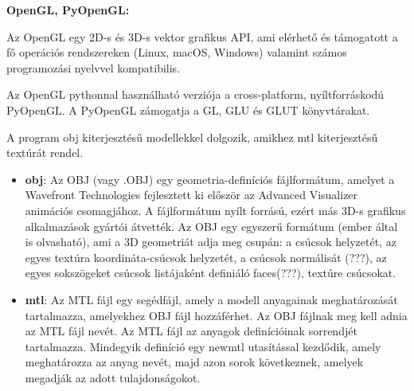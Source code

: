 



{\bf OpenGL, PyOpenGL:}

Az OpenGL egy 2D-s és 3D-s vektor grafikus  API, ami elérhető és támogatott a fő operációs rendszereken (Linux, macOS, Windows) valamint számos programozási nyelvvel kompatibilis.

Az OpenGL pythonnal használható verziója a cross-platform, nyíltforráskodú PyOpenGL. A PyOpenGL zámogatja a GL, GLU és GLUT könyvtárakat.

A program obj kiterjesztésű modellekkel dolgozik, amikhez mtl kiterjesztésű textúrát rendel. 
\begin{itemize}
\item {\bf obj}: Az OBJ (vagy .OBJ) egy geometria-definíciós fájlformátum, amelyet a Wavefront Technologies fejlesztett ki először az Advanced Visualizer animációs csomagjához. A fájlformátum nyílt forrású, ezért más 3D-s grafikus alkalmazások gyártói átvették.
Az OBJ egy egyszerű formátum (ember által is olvasható), ami a 3D geometriát adja meg csupán: a csúcsok helyzetét, az egyes textúra koordináta-csúcsok helyzetét, a csúcsok normálisát (???), az egyes sokszögeket csúcsok listájaként definiáló faces(???), textúre csúcsokat.  
\item {\bf mtl}: Az MTL fájl egy segédfájl, amely a modell anyagainak meghatározását tartalmazza, amelyekhez OBJ fájl hozzáférhet. Az OBJ fájlnak meg kell adnia az MTL fájl nevét. Az MTL fájl az anyagok definícióinak sorrendjét tartalmazza. Mindegyik definíció egy newmtl utasítással kezdődik, amely meghatározza az anyag nevét, majd azon sorok következnek, amelyek megadják az adott tulajdonságokot.
\end{itemize} 



